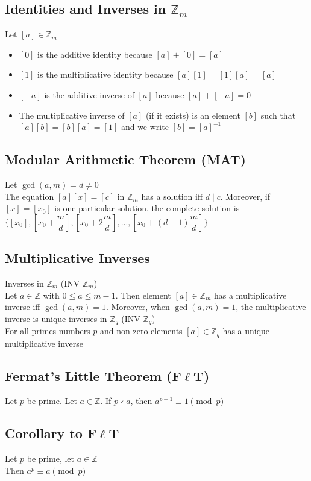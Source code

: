 \documentclass[12pt, letterpaper]{article}
\begin{document}
\subsection{Identities and Inverses in ${\mathbb{Z}_m}$}
Let $[a] \in \mathbb{Z}_m$
\begin{itemize}
    \item $[0]$ is the additive identity because $[a] + [0] = [a]$
    \item $[1]$ is the multiplicative identity because $[a][1] = [1][a] = [a]$
    \item $[-a]$ is the additive inverse of $[a]$ because $[a] + [-a] = 0$
    \item The multiplicative inverse of $[a]$ (if it exists) is an element $[b]$ such that $[a][b] = [b][a] = [1]$ and we write $[b] = [a]^{-1}$
\end{itemize}
\subsection{Modular Arithmetic Theorem (MAT)}
Let $\gcd(a, m) = d \neq 0$ \\
The equation $[a][x] = [c]$ in $\mathbb{Z}_m$ has a solution iff $d \mid c$. Moreover, if $[x] = [x_0]$
is one particular solution, the complete solution is \\
$\{[x_0], [x_0 + \dfrac{m}{d}], [x_0 + 2\dfrac{m}{d}], ... , [x_0 + (d-1)\dfrac{m}{d}]\}$ 
\subsection{Multiplicative Inverses}
Inverses in $\mathbb{Z}_m$ (INV $\mathbb{Z}_m$) \\
Let $a \in \mathbb{Z}$ with $0 \leq a \leq m-1$. Then element $[a] \in \mathbb{Z}_m$ has a multiplicative inverse 
iff $\gcd(a, m) = 1$. Moreover, when $\gcd(a, m) = 1$, the multiplicative inverse is unique inverses in $\mathbb{Z}_q$
(INV $\mathbb{Z}_q$) \\
For all primes numbers $p$ and non-zero elements $[a] \in \mathbb{Z}_q$ has a unique multiplicative inverse 
\subsection{Fermat's Little Theorem (F$\ell$T)}
Let $p$ be prime. Let $a \in \mathbb{Z}$. If $p \nmid a$, then $a^{p-1} \equiv 1 \pmod{p}$
\subsection{Corollary to F$\ell$T}
Let $p$ be prime, let $a \in \mathbb{Z}$ \\
Then $a^p \equiv a \pmod{p}$
\end{document}
